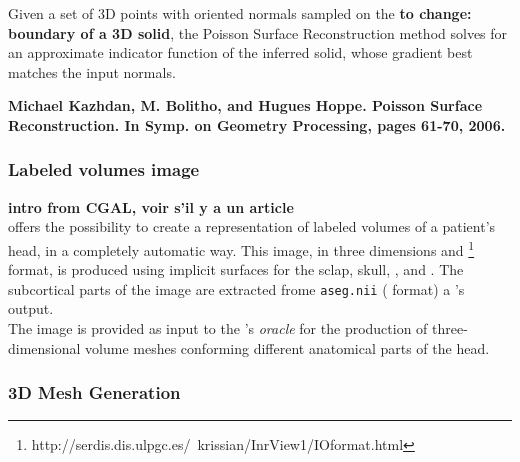 Given a set of 3D points with oriented normals sampled on the {\bf to change: boundary of a 3D solid}, the Poisson Surface Reconstruction method solves for an approximate indicator function of the inferred solid, whose gradient best matches the input normals.

{\bf Michael Kazhdan, M. Bolitho, and Hugues Hoppe. Poisson Surface Reconstruction. In Symp. on Geometry Processing, pages 61-70, 2006.} 



\subsubsection{Labeled volumes image}

{\bf intro from CGAL, voir s'il y a un article}\\
\FIJEE{} offers the possibility to create a representation of labeled volumes of a patient's head, in a completely automatic way. This image, in three dimensions and \INRIMAGE{}\footnote{http://serdis.dis.ulpgc.es/~krissian/InrView1/IOformat.html} format, is produced using implicit surfaces for the sclap, skull, \CSF{}, \GM{} and \WM{}. The subcortical parts of the image are extracted frome \texttt{aseg.nii} (\NIFTI{} format) a \FREESURFER{}'s output. \\
The image \INRIMAGE{} is provided as input to the \CGAL{}'s {\it oracle} for the production of three-dimensional volume meshes conforming different anatomical parts of the head.

\subsubsection{3D Mesh Generation}


